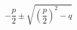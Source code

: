 \documentclass[fontsize=12pt,ngerman]{scrartcl}
\begin{document}
 
\blindtext
 
{\bfseries \blindtext}
 
{\itshape \blindtext}
 
{\itshape \bfseries \blindtext}
 
\begin{equation}
-\frac{p}{2} \pm \sqrt{ \left(\frac{p}{2} \right)^2 - q}
\end{equation}
 
 
\end{document}
